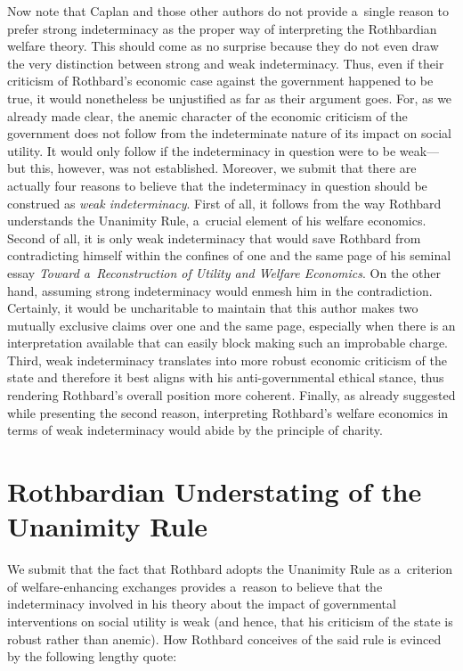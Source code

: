 Now note that Caplan and those other authors do not provide a~single reason to prefer strong indeterminacy as the proper way of interpreting the Rothbardian welfare theory. This should come as no surprise because they do not even draw the very distinction between strong and weak indeterminacy. Thus, even if their criticism of Rothbard's economic case against the government happened to be true, it would nonetheless be unjustified as far as their argument goes. For, as we already made clear, the anemic character of the economic criticism of the government does not follow from the indeterminate nature of its impact on social utility. It would only follow if the indeterminacy in question were to be weak---but this, however, was not established. Moreover, we submit that there are actually four reasons to believe that the indeterminacy in question should be construed as \textit{weak indeterminacy}. First of all, it follows from the way Rothbard understands the Unanimity Rule, a~crucial element of his welfare economics. Second of all, it is only weak indeterminacy that would save Rothbard from contradicting himself within the confines of one and the same page of his seminal essay \textit{Toward a~Reconstruction of Utility and Welfare Economics}. On the other hand, assuming strong indeterminacy would enmesh him in the contradiction. Certainly, it would be uncharitable to maintain that this author makes two mutually exclusive claims over one and the same page, especially when there is an interpretation available that can easily block making such an improbable charge. Third, weak indeterminacy translates into more robust economic criticism of the state and therefore it best aligns with his anti-governmental ethical stance, thus rendering Rothbard's overall position more coherent. Finally, as already suggested while presenting the second reason, interpreting Rothbard's welfare economics in terms of weak indeterminacy would abide by the principle of charity.



\section{Rothbardian Understating of the Unanimity Rule }

We submit that the fact that Rothbard adopts the Unanimity Rule as a~criterion of welfare-enhancing exchanges provides a~reason to believe that the indeterminacy involved in his theory about the impact of governmental interventions on social utility is weak (and hence, that his criticism of the state is robust rather than anemic). How Rothbard conceives of the said rule is evinced by the following lengthy quote:




